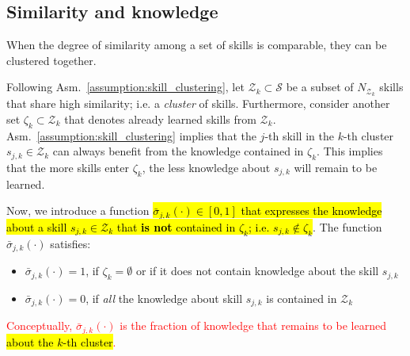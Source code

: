 \subsection{Similarity and knowledge}
\begin{tcolorbox}
	\begin{assumption}\label{assumption:skill_clustering} When the degree of similarity among a set of skills is comparable, they can be clustered together.
		\end{assumption}
\end{tcolorbox}
Following Asm.~\ref{assumption:skill_clustering}, let $\mathcal{Z}_k \subset \mathcal{S}$ be a subset of $N_{\mathcal{Z}_k}$ skills that share high similarity; i.e. a \emph{cluster} of skills. Furthermore, consider another set $\mathcal{\zeta}_k \subset \mathcal{Z}_k$ that denotes already learned skills from $\mathcal{Z}_k$. Asm.~\ref{assumption:skill_clustering} implies that the $j$-th skill in the $k$-th cluster $s_{j,k} \in \mathcal{Z}_k$ can always benefit from the knowledge contained in $\mathcal{\zeta}_k$. This implies that the more skills enter $\mathcal{\zeta}_k$, the less knowledge about $ s_{j,k} $ will remain to be learned.

Now, we introduce a function \hl{$\bar{\sigma}_{j,k}\left(\cdot\right)\in [0,1]$ that expresses the knowledge about a skill $s_{j,k} \in \mathcal{Z}_k$ that \textbf{is not} contained in $\mathcal{\zeta}_k$; i.e. $s_{j,k} \notin \mathcal{\zeta}_k$}. The function $\bar{\sigma}_{j,k}(\cdot)$ satisfies:
\begin{itemize}
	\item $\bar{\sigma}_{j,k}\left(\cdot\right) = 1$, if $\mathcal{\zeta}_k=\emptyset$ or if it does not contain knowledge about the skill $s_{j,k}$
	\item $\bar{\sigma}_{j,k}\left(\cdot\right) = 0$, if \emph{all} the knowledge about skill $s_{j,k}$ is contained in $\mathcal{Z}_k$
\end{itemize} 
\textcolor{red}{Conceptually, $\bar{\sigma}_ {j,k}\left(\cdot\right)$ is the fraction of knowledge that remains to be learned \hl{about the $k$-th cluster}.}
